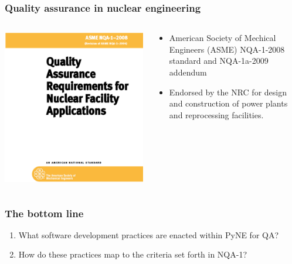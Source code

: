 \documentclass[12pt]{beamer}
\begin{document}
\begin{frame}[fragile]
\frametitle{Quality assurance in nuclear engineering}

\begin{columns}[T]
\begin{column}{0.5\textwidth}
\includegraphics[width=\textwidth]{figures/nqa-1-2008.png}
\end{column}
\begin{column}{0.5\textwidth}
\begin{itemize}
\item{American Society of Mechical Engineers (ASME)
NQA-1-2008 \cite{nqa} standard and NQA-1a-2009 \cite{add} addendum}
\item{Endorsed by the NRC for design and construction of power plants and reprocessing facilities.}
\end{itemize}
\end{column}
\end{columns}


\end{frame}
\begin{frame}[fragile]
\frametitle{The bottom line}

\begin{enumerate}
\item{What software development practices are enacted within PyNE for QA?}
\item{How do these practices map to the criteria set forth in NQA-1?}
\end{enumerate}


\end{frame}
\end{document}

